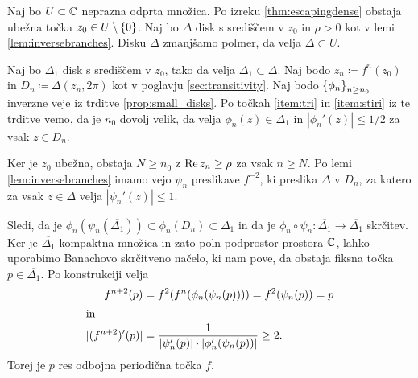 \begin{dokaz}
    Naj bo \(U \subset \mathbb C\) neprazna odprta množica. Po izreku \ref{thm:escapingdense} obstaja ubežna točka \(z_0 \in U \setminus \left\{ 0 \right\}\). Naj bo \(\Delta\) disk s središčem v \(z_0\) in \(\rho > 0\) kot v lemi \ref{lem:inversebranches}. Disku \(\Delta\) zmanjšamo polmer, da velja \(\Delta \subset U\).

    Naj bo \(\Delta_1\) disk s središčem v \(z_0\), tako da velja \(\overline{\Delta_1} \subset \Delta\). Naj bodo \(z_n \coloneq f^n (z_0)\) in \(D_n \coloneq \Delta (z_n, 2 \pi)\) kot v poglavju \ref{sec:transitivity}. Naj bodo \(\left\{ \phi_n \right\}_{n \geq n_0}\) inverzne veje iz trditve \ref{prop:small_disks}. Po točkah \ref{item:tri} in \ref{item:stiri} iz te trditve vemo, da je \(n_0\) dovolj velik, da velja \(\phi_n (z) \in \Delta_1\) in \(|\phi_n' (z)| \leq 1 / 2\) za vsak \(z \in D_n\).

    Ker je \(z_0\) ubežna, obstaja \(N \geq n_0\) z \(\operatorname{Re} z_n \geq \rho\) za vsak \(n \geq N\). Po lemi \ref{lem:inversebranches} imamo vejo \(\psi_n\) preslikave \(f^{-2}\), ki preslika \(\Delta\) v \(D_n\), za katero za vsak \(z \in \Delta\) velja \(|\psi_n' (z)| \leq 1\).

    Sledi, da je \(\phi_n (\psi_n (\overline{\Delta_1})) \subset \phi_n (D_n) \subset \Delta_1\) in da je \(\phi_n \circ \psi_{n} \colon \overline{\Delta_1} \to \overline{\Delta_1}\) skrčitev. Ker je \(\overline{\Delta_1}\) kompaktna množica in zato poln podprostor prostora \(\mathbb C\), lahko uporabimo Banachovo skrčitveno načelo, ki nam pove, da obstaja fiksna točka \(p \in \overline{\Delta_1}\). Po konstrukciji velja
    \begin{align*}
        f^{n + 2} (p)      & = f^2 (f^n (\phi_n (\psi_n (p)))) = f^2 (\psi_n (p)) = p       \\
        \intertext{in}
        |(f^{n + 2})' (p)| & = \frac{1}{|\psi_n' (p)| \cdot |\phi_n' (\psi_n (p))|} \geq 2.
    \end{align*}
    Torej je \(p\) res odbojna periodična točka \(f\).
\end{dokaz}